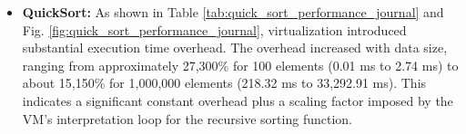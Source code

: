 \begin{itemize}
    \item \textbf{QuickSort:} As shown in Table \ref{tab:quick_sort_performance_journal} and Fig. \ref{fig:quick_sort_performance_journal}, virtualization introduced substantial execution time overhead. The overhead increased with data size, ranging from approximately 27,300\% for 100 elements (0.01 ms to 2.74 ms) to about 15,150\% for 1,000,000 elements (218.32 ms to 33,292.91 ms). This indicates a significant constant overhead plus a scaling factor imposed by the VM's interpretation loop for the recursive sorting function.
          \begin{table}[!t]
              \centering
              \caption{Quick Sort Execution Time Results (ms)}
              \label{tab:quick_sort_performance_journal}
\end{table}
\end{itemize}
